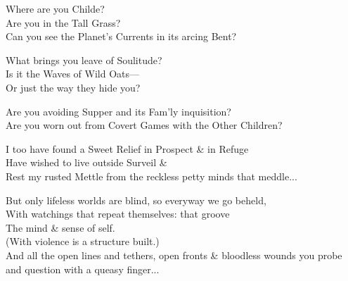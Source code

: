 

\secdiv

Where are you Childe? \\
Are you in the Tall Grass? \\
Can you see the Planet's Currents in its arcing Bent? 

What brings you leave of Soulitude? \\
Is it the Waves of Wild Oats— \\
Or just the way they hide you? 

Are you avoiding Supper and its Fam'ly inquisition? \\
Are you worn out from Covert Games with the Other Children?

I too have found a Sweet Relief in Prospect \& in Refuge \\
Have wished to live outside Surveil \& \\
Rest my rusted Mettle from the reckless petty minds that meddle...

But only lifeless worlds are blind, so everyway we go beheld, \\
With watchings that repeat themselves: that groove \\
The mind \& sense of self. \\
(With violence is a structure built.) \\
And all the open lines and tethers, open fronts \& bloodless wounds you probe and question with a queasy finger...
